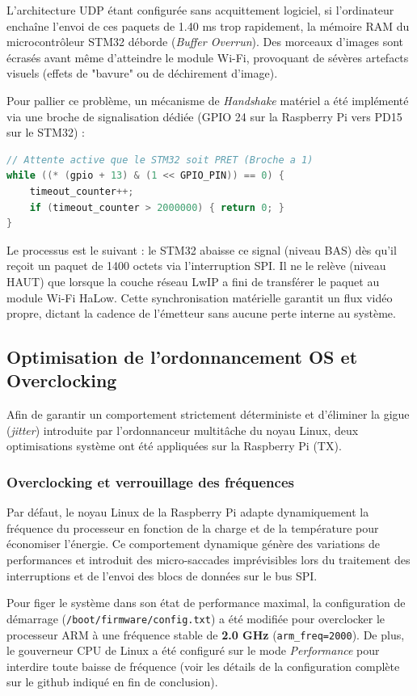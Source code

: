 L'architecture UDP étant configurée sans acquittement logiciel, si l'ordinateur enchaîne l'envoi de ces paquets de 
1.40 ms trop rapidement, la mémoire RAM du microcontrôleur STM32 déborde (\textit{Buffer Overrun}). 
Des morceaux d'images sont écrasés avant même d'atteindre le module Wi-Fi, provoquant de sévères artefacts 
visuels (effets de "bavure" ou de déchirement d'image).

Pour pallier ce problème, un mécanisme de \textit{Handshake} matériel a été implémenté via une broche de 
signalisation dédiée (GPIO 24 sur la Raspberry Pi vers PD15 sur le STM32) :

\begin{lstlisting}[language=C]
// Attente active que le STM32 soit PRET (Broche a 1)
while ((* (gpio + 13) & (1 << GPIO_PIN)) == 0) {
    timeout_counter++;
    if (timeout_counter > 2000000) { return 0; }
}
\end{lstlisting}

Le processus est le suivant : le STM32 abaisse ce signal (niveau BAS) dès qu'il reçoit un paquet de 1400 octets 
via l'interruption SPI. Il ne le relève (niveau HAUT) que lorsque la couche réseau LwIP a fini de transférer 
le paquet au module Wi-Fi HaLow. Cette synchronisation matérielle garantit un flux vidéo propre, dictant la cadence 
de l'émetteur sans aucune perte interne au système.

\subsection{Optimisation de l'ordonnancement OS et Overclocking}
Afin de garantir un comportement strictement déterministe et d'éliminer la gigue (\textit{jitter}) 
introduite par l'ordonnanceur multitâche du noyau Linux, deux optimisations système ont été 
appliquées sur la Raspberry Pi (TX).

\subsubsection{Overclocking et verrouillage des fréquences}
Par défaut, le noyau Linux de la Raspberry Pi adapte dynamiquement la fréquence du processeur en fonction de 
la charge et de la température pour économiser l'énergie. Ce comportement dynamique génère des variations de 
performances et introduit des micro-saccades imprévisibles lors du traitement des interruptions et de l'envoi 
des blocs de données sur le bus SPI.

Pour figer le système dans son état de performance maximal, la configuration de démarrage \newline (\texttt{/boot/firmware/config.txt}) 
a été modifiée pour overclocker le processeur ARM à une fréquence stable de \textbf{2.0 GHz} (\texttt{arm\_freq=2000}). De plus, 
le gouverneur CPU de Linux a été configuré sur le mode \textit{Performance} pour interdire toute baisse de fréquence 
(voir les détails de la configuration complète sur le github indiqué en fin de conclusion).

